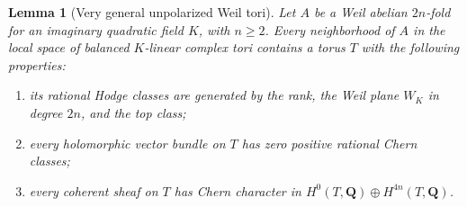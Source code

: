 \documentclass[11pt]{article}
\newtheorem{lemma}[theorem]{Lemma}
\theoremstyle{definition}
\theoremstyle{remark}
\newcommand{\Q}{\mathbf Q}
\begin{document}
\begin{lemma}[Very general unpolarized Weil tori]
\label{lem:generic-weil-torus}
Let $A$ be a Weil abelian $2n$-fold for an imaginary quadratic
field $K$, with $n\ge2$.  Every neighborhood of $A$ in the local
space of balanced $K$-linear complex tori contains a torus $T$
with the following properties:
\begin{enumerate}[label=\textnormal{(\roman*)}]
\item its rational Hodge classes are generated by the rank,
the Weil plane $W_K$ in degree $2n$, and the top class;
\item every holomorphic vector bundle on $T$ has zero positive
rational Chern classes;
\item every coherent sheaf on $T$ has Chern character in
$H^0(T,\Q)\oplus H^{4n}(T,\Q)$.
\end{enumerate}
\end{lemma}
\end{document}
